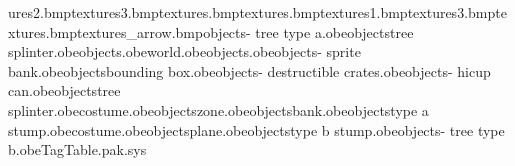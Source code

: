 ures\blue2.bmp textures\blue3.bmp textures\bluesnake.bmp textures\caterpillar.bmp textures\green1.bmp textures\green3.bmp textures\crate.bmp textures\crate_arrow.bmp objects\bank - tree type a.obe objects\white tree splinter.obe objects\start.obe world.obe objects\butterfly.obe objects\bank - sprite bank.obe objects\butterfly bounding box.obe objects\bank - destructible crates.obe objects\bank - hicup can.obe objects\orange tree splinter.obe costume\taztarzan.obe objects\drop zone.obe objects\sprite bank.obe objects\tree type a stump.obe costume\elephant.obe objects\death plane.obe objects\tree type b stump.obe objects\bank - tree type b.obe TagTable.pak.sys 